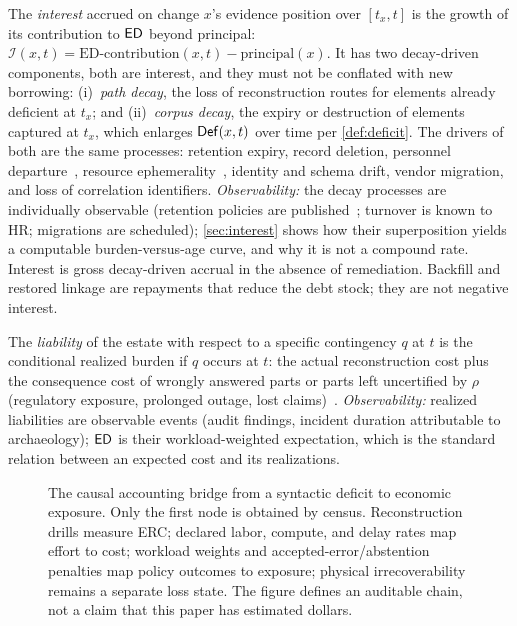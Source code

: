 \begin{definition}
\label{def:interest}
The \emph{interest} accrued on change $x$'s evidence position over $[t_x, t]$ is
the growth of its contribution to $\mathsf{ED}$ beyond principal:
$\mathcal{I}(x, t) = \mathrm{ED}\text{-contribution}(x, t) - \text{principal}(x)$.
It has two decay-driven components, both are interest, and they must not be
conflated with new borrowing: (i)~\emph{path decay}, the loss of reconstruction
routes for elements already deficient at $t_x$; and (ii)~\emph{corpus decay}, the
expiry or destruction of elements captured at $t_x$, which enlarges
$\mathsf{Def}(x, t)$ over time per \cref{def:deficit}. The drivers of both are the same
processes: retention expiry, record deletion, personnel
departure~\cite{rigby2016}, resource ephemerality~\cite{burns2016}, identity and
schema drift, vendor migration, and loss of correlation identifiers.
\emph{Observability:} the decay processes are individually observable (retention
policies are published~\cite{cloudtrail,ghdocs,nist80092}; turnover is known to HR;
migrations are scheduled); \cref{sec:interest} shows how their superposition yields
a computable burden-versus-age curve, and why it is not a compound rate.
Interest is gross decay-driven accrual in the absence of remediation. Backfill and
restored linkage are repayments that reduce the debt stock; they are not negative
interest.
\end{definition}

\begin{definition}
\label{def:liability}
The \emph{liability} of the estate with respect to a specific contingency $q$ at $t$
is the conditional realized burden if $q$ occurs at $t$: the actual reconstruction
cost plus the consequence cost of wrongly answered parts or parts left uncertified
by $\rho$ (regulatory
exposure, prolonged outage, lost claims)~\cite{sedona2018,sox2002}.
\emph{Observability:} realized liabilities are observable events (audit findings,
incident duration attributable to archaeology); $\mathsf{ED}$ is their workload-weighted
expectation, which is the standard relation between an expected cost and its
realizations.
\end{definition}

\begin{figure}[t]
\centering
\resizebox{0.70\columnwidth}{!}{}
\caption{The causal accounting bridge from a syntactic deficit to economic
exposure. Only the first node is obtained by census. Reconstruction drills
measure ERC; declared labor, compute, and delay rates map effort to cost; workload
weights and accepted-error/abstention penalties map policy outcomes to exposure;
physical irrecoverability remains a separate loss state. The figure
defines an auditable chain, not a claim that this paper has estimated dollars.}
\label{fig:economic-chain}
\end{figure}

